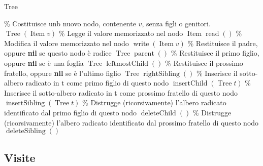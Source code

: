         \begin{algorithm}[H]
            \caption{Tree}
            \% Costituisce unb nuovo nodo, contenente $v$, senza figli o genitori. \newline
            $\operatorname{Tree}(\operatorname{Item} v) $ \newline
            \% Legge il valore memorizzato nel nodo \newline
            $\operatorname{Item} \operatorname{read}()$ \newline
            \% Modifica il valore memorizzato nel nodo \newline
            $\operatorname{write}(\operatorname{Item} v)$ \newline
            \% Restituisce il padre, oppure \textbf{nil} se questo nodo è radice \newline
            $\operatorname{Tree} \operatorname{parent}() $ \newline
            \% Restituisce il primo figlio, oppure \textbf{nil} se è una foglia \newline
            $\operatorname{Tree} \operatorname{leftmostChild}()$ \newline
            \% Restituisce il prossimo fratello, oppure \textbf{nil} se è l'ultimo figlio \newline
            $\operatorname{Tree} \operatorname{rightSibling}()$ \newline
            \% Inserisce il sotto-albero radicato in t come primo figlio di questo nodo\newline
            $\operatorname{insertChild}(\operatorname{Tree} t)$ \newline
            \% Inserisce il sotto-albero radicato in t come prossimo fratello di questo nodo\newline
            $\operatorname{insertSibling}(\operatorname{Tree} t)$ \newline
            \% Distrugge (ricorsivamente) l'albero radicato identificato dal primo figlio di questo nodo \newline
            $\operatorname{deleteChild}()$ \newline
            \% Distrugge (ricorsivamente) l'albero radicato identificato dal prossimo fratello di questo nodo \newline
            $\operatorname{deleteSibling}()$
        \end{algorithm}
    \subsection{Visite}
